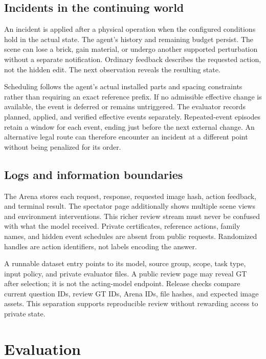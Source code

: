 \documentclass[10pt,twocolumn,letterpaper]{article}
\begin{document}
\subsection{Incidents in the continuing world}
An incident is applied after a physical operation when the configured conditions hold in the actual state. The agent's history and remaining budget persist. The scene can lose a brick, gain material, or undergo another supported perturbation without a separate notification. Ordinary feedback describes the requested action, not the hidden edit. The next observation reveals the resulting state.

Scheduling follows the agent's actual installed parts and spacing constraints rather than requiring an exact reference prefix. If no admissible effective change is available, the event is deferred or remains untriggered. The evaluator records planned, applied, and verified effective events separately. Repeated-event episodes retain a window for each event, ending just before the next external change. An alternative legal route can therefore encounter an incident at a different point without being penalized for its order.

\subsection{Logs and information boundaries}
The Arena stores each request, response, requested image hash, action feedback, and terminal result. The spectator page additionally shows multiple scene views and environment interventions. This richer review stream must never be confused with what the model received. Private certificates, reference actions, family names, and hidden event schedules are absent from public requests. Randomized handles are action identifiers, not labels encoding the answer.

A runnable dataset entry points to its model, source group, scope, task type, input policy, and private evaluator files. A public review page may reveal GT after selection; it is not the acting-model endpoint. Release checks compare current question IDs, review GT IDs, Arena IDs, file hashes, and expected image assets. This separation supports reproducible review without rewarding access to private state.

\section{Evaluation}
\end{document}
